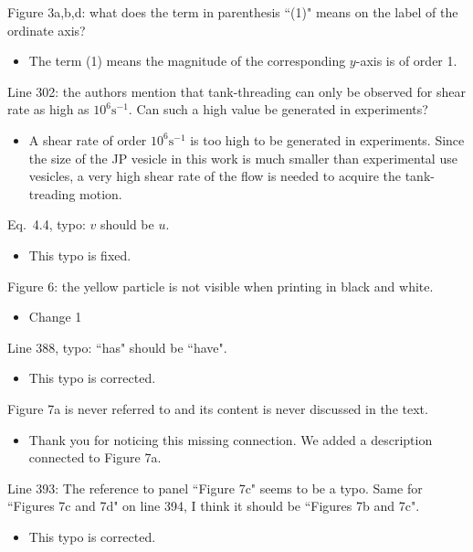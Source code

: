 \documentclass[11pt]{article}
\newcommand{\comment}[1]{{\color{blue} #1}}
\begin{document}
\noindent
\comment{Figure 3a,b,d: what does the term in parenthesis ``(1)" means
on the label of the ordinate axis?}
\begin{itemize}
  \item The term (1) means the magnitude of the corresponding $y$-axis is of order 1.
\end{itemize}

\noindent
\comment{Line 302: the authors mention that tank-threading can only be
observed for shear rate as high as $10^{6}\text{s}^{-1}$. Can such a
high value be generated in experiments?}
\begin{itemize}
  \item A shear rate of order $10^{6}\text{s}^{-1}$ is too high to be generated in experiments.
Since the size of the JP vesicle in this work is much smaller than experimental use vesicles, 
a very high shear rate of the flow is needed to acquire the tank-treading motion.
\end{itemize}

\noindent
\comment{Eq.~4.4, typo: $v$ should be $u$.}
\begin{itemize}
  \item This typo is fixed.
\end{itemize}

\noindent
\comment{Figure 6: the yellow particle is not visible when printing in
black and white.}
\begin{itemize}
  \item Change 1 
\end{itemize}

\noindent
\comment{Line 388, typo: ``has" should be ``have".}
\begin{itemize}
  \item This typo is corrected.
\end{itemize}

\noindent
\comment{Figure 7a is never referred to and its content is never
discussed in the text.}
\begin{itemize}
  \item Thank you for noticing this missing connection. We added a description connected to Figure 7a.
\end{itemize}

\noindent
\comment{Line 393: The reference to panel ``Figure 7c" seems to be a
typo. Same for ``Figures 7c and 7d" on line 394, I think it should be
``Figures 7b and 7c".}
\begin{itemize}
  \item This typo is corrected.
\end{itemize}
\end{document}
